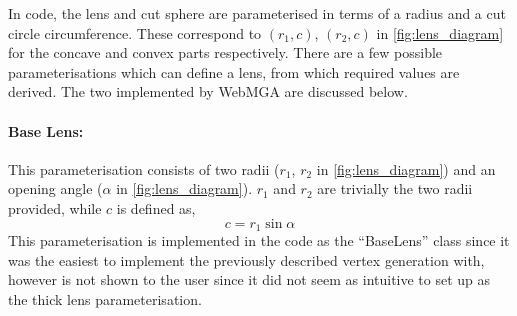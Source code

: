 In code, the lens and cut sphere are parameterised in terms of a radius and a cut circle circumference. These correspond to $(r_1,c)$, $(r_2,c)$ in \cref{fig:lens_diagram} for the concave and convex parts respectively. There are a few possible parameterisations which can define a lens, from which required values are derived. The two implemented by WebMGA are discussed below.
\paragraph{Base Lens:}
\label{base_lens_para}
This parameterisation consists of two radii ($r_1$, $r_2$ in  \cref{fig:lens_diagram}) and an opening angle ($\alpha$ in  \cref{fig:lens_diagram}). $r_1$ and $r_2$ are trivially the two radii provided, while $c$ is defined as,
\begin{equation}
c=r_1\sin\alpha
\label{lens_c_equation}
\end{equation}
This parameterisation is implemented in the code as the ``BaseLens'' class since it was the easiest to implement the previously described vertex generation with, however is not shown to the user since it did not seem as intuitive to set up as the thick lens parameterisation.
